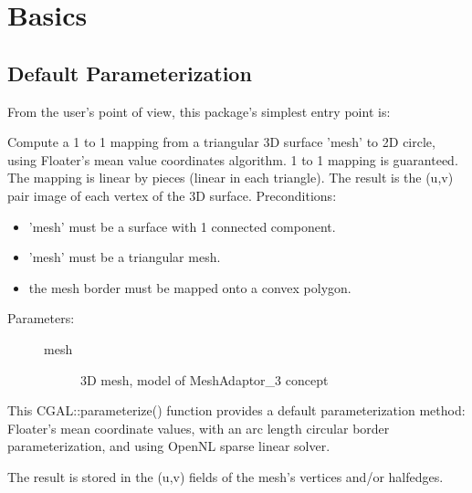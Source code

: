 \section{Basics}


\subsection{Default Parameterization}

From the user's point of view, this package's simplest entry point is:

{
Compute a 1 to 1 mapping from a triangular 3D surface 'mesh' to 2D circle, using
Floater's mean value coordinates algorithm. 1 to 1 mapping is guaranteed.
The mapping is linear by pieces (linear in each triangle). The result is the (u,v) pair image of each vertex of the 3D surface.
Preconditions:\begin{itemize}
\item 'mesh' must be a surface with 1 connected component.\item 'mesh' must be a triangular mesh.\item the mesh border must be mapped onto a convex polygon.\end{itemize}
}
\begin{description}
\item[Parameters: ]
\begin{description}
\item[mesh]3D mesh, model of MeshAdaptor\_3 concept \end{description}
\end{description}

This CGAL::parameterize() function provides a default parameterization method: Floater's
mean coordinate values, with an arc length circular border parameterization, and using
OpenNL sparse linear solver.

The result is stored in the (u,v) fields of the mesh's vertices and/or halfedges.

